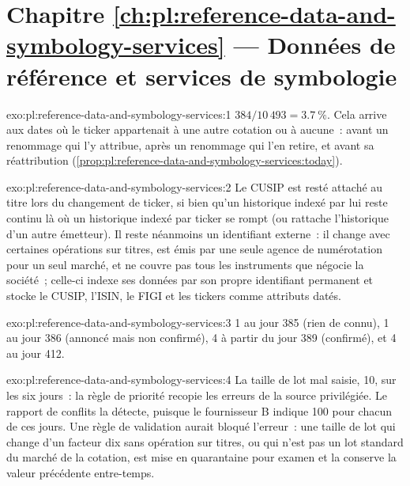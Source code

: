 \section*{Chapitre \ref{ch:pl:reference-data-and-symbology-services} --- Données de référence et services de symbologie}

\begin{solution}{exo:pl:reference-data-and-symbology-services:1}
$384 / 10\,493 = 3.7~\%$. Cela arrive aux dates où le ticker appartenait à une autre cotation ou à aucune~: avant un renommage qui l'y attribue,
après un renommage qui l'en retire, et avant sa réattribution (\cref{prop:pl:reference-data-and-symbology-services:today}).
\end{solution}

\begin{solution}{exo:pl:reference-data-and-symbology-services:2}
Le CUSIP est resté attaché au titre lors du changement de ticker, si bien qu'un historique indexé par lui reste continu là où un historique indexé par ticker
se rompt (ou rattache l'historique d'un autre émetteur). Il reste néanmoins un identifiant externe~: il change avec certaines opérations sur titres,
est émis par une seule agence de numérotation pour un seul marché, et ne couvre pas tous les instruments que négocie la société~; celle-ci
indexe ses données par son propre identifiant permanent et stocke le CUSIP, l'ISIN, le FIGI et les tickers comme attributs datés.
\end{solution}

\begin{solution}{exo:pl:reference-data-and-symbology-services:3}
1 au jour 385 (rien de connu), 1 au jour 386 (annoncé mais non confirmé), 4 à partir du jour 389 (confirmé), et 4 au jour 412.
\end{solution}

\begin{solution}{exo:pl:reference-data-and-symbology-services:4}
La taille de lot mal saisie, 10, sur les six jours~: la règle de priorité recopie les erreurs de la source privilégiée. Le rapport de conflits la détecte, puisque
le fournisseur B indique 100 pour chacun de ces jours. Une règle de validation aurait bloqué l'erreur~: une taille de lot qui change d'un facteur dix
sans opération sur titres, ou qui n'est pas un lot standard du marché de la cotation, est mise en quarantaine pour examen et la  conserve
la valeur précédente entre-temps.
\end{solution}

